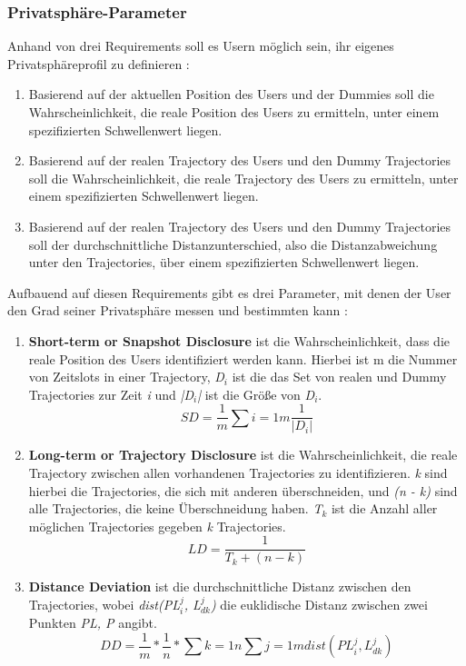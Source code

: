 \subsubsection{Privatsphäre-Parameter \cite{You2007, Lei2012}} \label{subsubsection:dgparameter}
Anhand von drei Requirements soll es Usern möglich sein, ihr eigenes Privatsphäreprofil zu definieren \cite{Lei2012}:
\begin{enumerate}
	\item Basierend auf der aktuellen Position des Users und der Dummies soll die Wahrscheinlichkeit, die reale Position des Users zu ermitteln, unter einem spezifizierten Schwellenwert liegen.
	\item Basierend auf der realen Trajectory des Users und den Dummy Trajectories soll die Wahrscheinlichkeit, die reale Trajectory des Users zu ermitteln, unter einem spezifizierten Schwellenwert liegen.
	\item Basierend auf der realen Trajectory des Users und den Dummy Trajectories soll der durchschnittliche Distanzunterschied, also die Distanzabweichung unter den Trajectories, über einem spezifizierten Schwellenwert liegen.
\end{enumerate}
Aufbauend auf diesen Requirements gibt es drei Parameter, mit denen der User den Grad seiner Privatsphäre messen und bestimmten kann \cite{You2007}:
\begin{enumerate}
	\item \textbf{Short-term or Snapshot Disclosure} ist die Wahrscheinlichkeit, dass die reale Position des Users identifiziert werden kann. Hierbei ist m die Nummer von Zeitslots in einer Trajectory, \textit{D$_{i}$} ist die das Set von realen und Dummy Trajectories zur Zeit \textit{i} und \textit{|D$_{i}$|} ist die Größe von \textit{D$_{i}$}.
	\begin{equation}
	\label{equation:SD}
	SD = \frac{1}{m} \sum{i=1}{m}{\frac{1}{\left\lvert D_{i} \right\rvert}}
	\end{equation}	
	
	\item \textbf{Long-term or Trajectory Disclosure} ist die Wahrscheinlichkeit, die reale Trajectory zwischen allen vorhandenen Trajectories zu identifizieren. \textit{k} sind hierbei die Trajectories, die sich mit anderen überschneiden, und \textit{(n - k)} sind alle Trajectories, die keine Überschneidung haben. \textit{T$_{k}$} ist die Anzahl aller möglichen Trajectories gegeben \textit{k} Trajectories.
	\begin{equation}
	\label{equation:LD}
	LD = \frac{1}{T_{k} + \left( n - k \right)}
	\end{equation}	
	
	\item \textbf{Distance Deviation} ist die durchschnittliche Distanz zwischen den Trajectories, wobei \textit{dist(PL$_{i}^{j}$, L$_{dk}^{j}$)} die euklidische Distanz zwischen zwei Punkten \textit{PL, P} angibt.
	\begin{equation}
	\label{equation:DD}
	DD = \frac{1}{m} * \frac{1}{n} * \sum{k=1}{n}{\sum{j=1}{m}{dist\left(PL_{i}^{j}, L_{dk}^{j}\right)}}
	\end{equation}	
\end{enumerate}